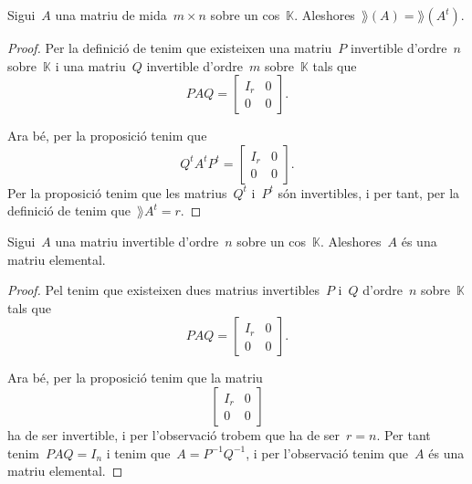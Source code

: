 \documentclass[../../Main.tex]{subfiles}
\begin{document}
	\begin{proposition}
		\label{prop:rang de la matriu transposada és el rang de la matriu}
		Sigui~\(A\) una matriu de mida~\(m\times n\) sobre un cos~\(\mathbb{K}\).
		Aleshores~\(\rang(A)=\rang(A^{t})\).
		\begin{proof}
			Per la definició de  tenim que existeixen una matriu~\(P\) invertible d'ordre~\(n\) sobre~\(\mathbb{K}\) i una matriu~\(Q\) invertible d'ordre~\(m\) sobre~\(\mathbb{K}\) tals que
			\[PAQ=\left[\begin{array}{c|c}
			I_{r} & 0 \\\hline
			0 & 0
			\end{array}\right].\]

			Ara bé, per la proposició  tenim que
			\[Q^{t}A^{t}P^{t}=\left[\begin{array}{c|c}
			I_{r} & 0 \\\hline
			0 & 0
			\end{array}\right].\]
			Per la proposició  tenim que les matrius~\(Q^{t}\) i~\(P^{t}\) són invertibles, i per tant, per la definició de  tenim que~\(\rang{A^{t}}=r\).
		\end{proof}
	\end{proposition}
	\begin{proposition}
		\label{prop:una matriu invertible és producte de matrius elementals}
		Sigui~\(A\) una matriu invertible d'ordre~\(n\) sobre un cos~\(\mathbb{K}\).
		Aleshores~\(A\) és una matriu elemental.
		\begin{proof}
			Pel  tenim que existeixen dues matrius invertibles~\(P\) i~\(Q\) d'ordre~\(n\) sobre~\(\mathbb{K}\) tals que
			\[PAQ=\left[\begin{array}{c|c}
			I_{r} & 0\\\hline
			0 & 0
			\end{array}\right].\]

			Ara bé, per la proposició  tenim que la matriu
			\[\left[\begin{array}{c|c}
			I_{r} & 0\\\hline
			0 & 0
			\end{array}\right]\]
			ha de ser invertible, i per l'observació  trobem que ha de ser~\(r=n\).
			Per tant tenim~\(PAQ=I_{n}\) i tenim que~\(A=P^{-1}Q^{-1}\), i per l'observació  tenim que~\(A\) és una matriu elemental.
		\end{proof}
	\end{proposition}
\end{document}
